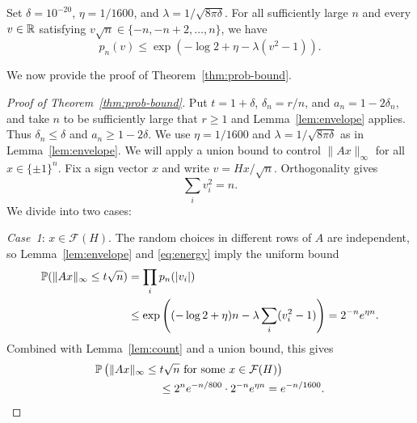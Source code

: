 \documentclass[11pt,reqno]{amsart}
\begin{document}
\begin{lem}\label{lem:envelope}
    Set $\delta=10^{-20}$, $\eta=1/1600$, and
    $\lambda=1/\sqrt{8\pi\delta}$. For all sufficiently large $n$
    and every $v\in{\mathbb{R}}$ satisfying
    $v\sqrt n\in\{-n,-n+2,\ldots,n\}$, we have
    \begin{equation}\label{eq:envelope}
        p_n(v)\le
        \exp\left(-\log2+\eta-\lambda(v^2-1)\right).
    \end{equation}
\end{lem}

We now provide the proof of Theorem~\ref{thm:prob-bound}.
\begin{proof}[Proof of Theorem~\ref{thm:prob-bound}]
    Put $t=1+\delta$, $\delta_n=r/n$, and $a_n=1-2\delta_n$, and take $n$ to be sufficiently large that $r\ge1$ and Lemma~\ref{lem:envelope} applies. Thus $\delta_n\le\delta$ and $a_n\ge1-2\delta$. We use $\eta=1/1600$ and $\lambda=1/\sqrt{8\pi\delta}$ as in Lemma~\ref{lem:envelope}. We will apply a union bound to control $\|Ax\|_{\infty}$ for all $x\in\{\pm1\}^n$. Fix a sign vector $x$ and write $v=Hx/\sqrt n$. Orthogonality gives
    \begin{equation}\label{eq:energy}
        \sum_i v_i^2=n.
    \end{equation}
    We divide into two cases:

    \medskip
    {\em Case~1}: $x\in\mathcal F(H)$. The random choices in different rows of $A$ are independent, so Lemma~\ref{lem:envelope} and \eqref{eq:energy} imply the uniform bound
    \[
    \begin{aligned}
        {\mathbb{P}}(\|Ax\|_\infty\le t\sqrt n)
        &=\prod_i p_n(|v_i|)\\
        &\le\exp\left(( -\log2+\eta)n-\lambda\sum_i(v_i^2-1)\right)
        =2^{-n}e^{\eta n}.
    \end{aligned}
    \]
    Combined with Lemma~\ref{lem:count} and a union bound, this gives
    \begin{equation}\label{eq:prob-case-1}
    \begin{aligned}
        &\bbP\left(\|Ax\|_{\infty}\le t\sqrt n
            \mbox{ for some }x\in\mathcal F(H)\right)\\
        &\hspace{20mm}\le2^n e^{-n/800}\cdot2^{-n}e^{\eta n}
        =e^{-n/1600}.
    \end{aligned}
    \end{equation}


\end{proof}
\end{document}
